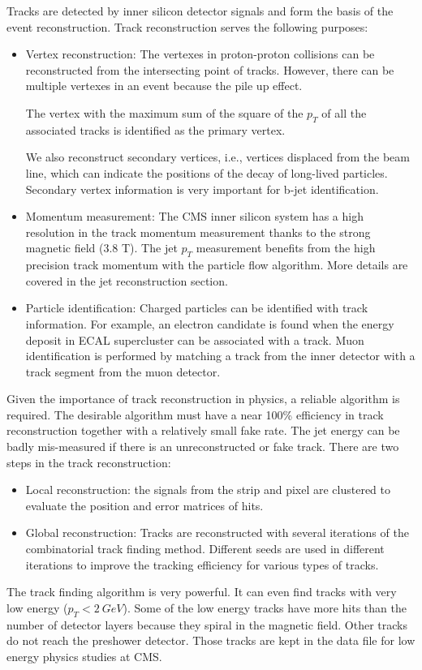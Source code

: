 Tracks are detected by inner silicon detector signals and form the basis of the event reconstruction. Track reconstruction serves the following purposes: 
\begin{itemize}
\item Vertex reconstruction: The vertexes in proton-proton collisions can be reconstructed from the intersecting point of tracks. However, there can be multiple vertexes in an event because the pile up effect. 

The vertex with the maximum sum of the square of the $p_{T}$ of all the associated tracks is identified as the primary vertex. 

We also reconstruct secondary vertices, i.e., vertices displaced from the beam line, which can indicate the positions of the decay of long-lived particles. Secondary vertex information is very important for b-jet identification.
\item Momentum measurement: The CMS inner silicon system has a high resolution in the track momentum measurement thanks to the strong magnetic field (3.8 T). The jet $p_{T}$ measurement benefits from the high precision track momentum with the particle flow algorithm. More details are covered in the jet reconstruction section.
\item Particle identification: Charged particles can be identified with track information. For example, an electron candidate is found when the energy deposit in ECAL supercluster can be associated with a track. Muon identification is performed by matching a track from the inner detector with a track segment from the muon detector.
\end{itemize}

Given the importance of track reconstruction in physics, a reliable algorithm is required. The desirable algorithm must have a near 100\% efficiency in track reconstruction together with a relatively small fake rate. The jet energy can be badly mis-measured if there is an unreconstructed or fake track.
There are two steps in the track reconstruction: 
\begin{itemize}
\item Local reconstruction: the signals from the strip and pixel are clustered to evaluate the position and error matrices of hits.
\item Global reconstruction: Tracks are reconstructed with several iterations of the combinatorial track finding method\cite{Adam:2005cg}. Different seeds are used in different iterations to improve the tracking efficiency for various types of tracks.
\end{itemize}
The track finding algorithm is very powerful. It can even find tracks with very low energy ($p_{T}<2~GeV$). Some of the low energy tracks have more hits than the number of detector layers because they spiral in the magnetic field. Other tracks do not reach the preshower detector. Those tracks are kept in the data file for low energy physics studies at CMS. 

